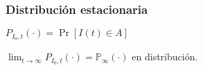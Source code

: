 \begin{frame}
    \frametitle{Distribución estacionaria}
    \begin{list}{\bullet}{}
        \item
            $
                P_{I_0,t}(\cdot)
                = \Pr[I(t)\in A]
            $
        \item
            $
                \displaystyle
                \lim_{t \to \infty}
                P_{I_0,t}(\cdot)
                = \mathbb{P}_{\infty}(\cdot)
            $ en distribución.
    \end{list}
\end{frame}